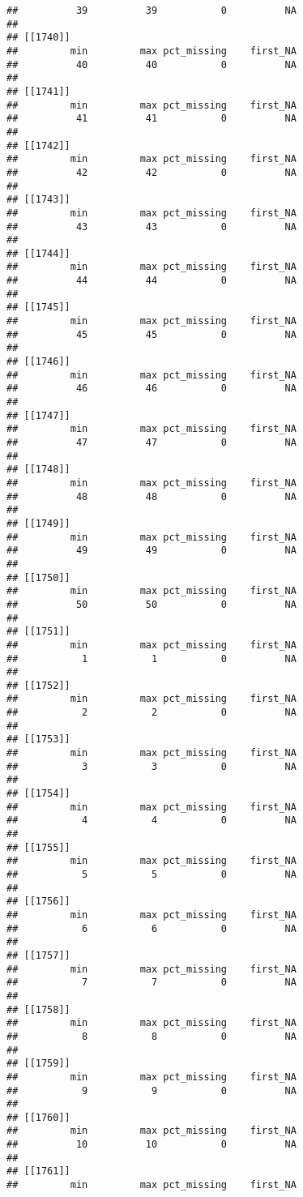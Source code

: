 \documentclass[
]{article}
\begin{document}
\begin{verbatim}
##          39          39           0          NA 
## 
## [[1740]]
##         min         max pct_missing    first_NA 
##          40          40           0          NA 
## 
## [[1741]]
##         min         max pct_missing    first_NA 
##          41          41           0          NA 
## 
## [[1742]]
##         min         max pct_missing    first_NA 
##          42          42           0          NA 
## 
## [[1743]]
##         min         max pct_missing    first_NA 
##          43          43           0          NA 
## 
## [[1744]]
##         min         max pct_missing    first_NA 
##          44          44           0          NA 
## 
## [[1745]]
##         min         max pct_missing    first_NA 
##          45          45           0          NA 
## 
## [[1746]]
##         min         max pct_missing    first_NA 
##          46          46           0          NA 
## 
## [[1747]]
##         min         max pct_missing    first_NA 
##          47          47           0          NA 
## 
## [[1748]]
##         min         max pct_missing    first_NA 
##          48          48           0          NA 
## 
## [[1749]]
##         min         max pct_missing    first_NA 
##          49          49           0          NA 
## 
## [[1750]]
##         min         max pct_missing    first_NA 
##          50          50           0          NA 
## 
## [[1751]]
##         min         max pct_missing    first_NA 
##           1           1           0          NA 
## 
## [[1752]]
##         min         max pct_missing    first_NA 
##           2           2           0          NA 
## 
## [[1753]]
##         min         max pct_missing    first_NA 
##           3           3           0          NA 
## 
## [[1754]]
##         min         max pct_missing    first_NA 
##           4           4           0          NA 
## 
## [[1755]]
##         min         max pct_missing    first_NA 
##           5           5           0          NA 
## 
## [[1756]]
##         min         max pct_missing    first_NA 
##           6           6           0          NA 
## 
## [[1757]]
##         min         max pct_missing    first_NA 
##           7           7           0          NA 
## 
## [[1758]]
##         min         max pct_missing    first_NA 
##           8           8           0          NA 
## 
## [[1759]]
##         min         max pct_missing    first_NA 
##           9           9           0          NA 
## 
## [[1760]]
##         min         max pct_missing    first_NA 
##          10          10           0          NA 
## 
## [[1761]]
##         min         max pct_missing    first_NA 

\end{verbatim}
\end{document}
